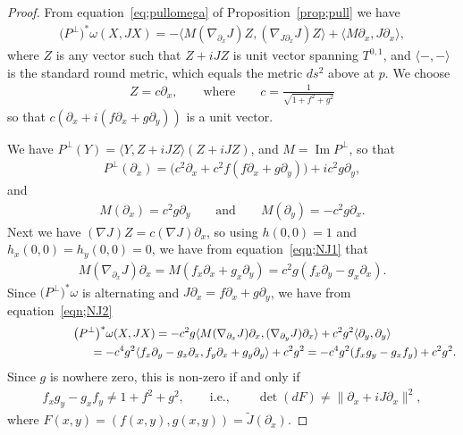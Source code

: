 \documentclass[pdftex]{sigma}
\numberwithin{equation}{section}
\begin{document}
\begin{proof}
From equation~\eqref{eq;pullomega} of Proposition~\ref{prop;pull} we have
\begin{gather*}
\big(P^\perp\big)^*\omega(X,JX) = - \langle M ( \nabla_{\partial_x} J ) Z, ( \nabla_{J \partial_x} J ) Z \rangle +
 \langle M \partial_x , J\partial_x \rangle,
\end{gather*}
where $Z$ is any vector such that $Z + iJZ$ is unit vector spanning $T^{0,1}$, and $ \langle - , - \rangle$ is the standard round metric, which equals the metric $ds^2$ above at $p$. We choose
\begin{gather*}
Z = c \partial_x, \qquad \textrm{where} \qquad c = \frac{1}{\sqrt{1+f^2+g^2}}
\end{gather*}
so that $c(\partial_x + i (f \partial_x + g \partial_y ) )$ is a unit vector.

We have $P^\perp(Y) = \langle Y, Z+iJZ \rangle (Z+iJZ)$, and $M= \operatorname{Im} P^\perp$, so that
\begin{gather*}
P^\perp(\partial_x) = \big( c^2 \partial_x + c^2 f ( f \partial_x + g \partial_y ) \big) + i c^2 g \partial_y ,
\end{gather*}
and
\begin{gather*}
M(\partial_x) = c^2 g \partial_y \qquad \textrm{and} \qquad M(\partial_y) = -c^2 g \partial_x.
\end{gather*}
Next we have $ (\nabla J) Z = c (\nabla J) \partial_x $, so using $h(0,0) =1$ and $h_x(0,0) = h_y(0,0) =0$, we have from equation~\eqref{eqn;NJ1} that
\begin{gather*}
M( \nabla_{\partial_x} J) \partial_x = M ( f_x \partial_x + g_x \partial_y ) = c^2 g ( f_x \partial_y - g_x \partial_x ).
\end{gather*}
Since $\big(P^\perp\big)^*\omega$ is alternating and $J \partial_x = f \partial_x + g \partial_y$, we have from equation~\eqref{eqn;NJ2}
\begin{gather*}
\big(P^\perp\big)^*\omega(X,JX) =-c^2 g \langle M ( \nabla_{\partial_x} J) \partial_x , ( \nabla_{\partial_y} J ) \partial_x \rangle +
 c^2 g^2 \langle \partial_y , \partial_y \rangle \\
\hphantom{\big(P^\perp\big)^*\omega(X,JX)}{} =-c^4 g^2 \langle f_x \partial_y - g_x \partial_x , f_y \partial_x + g_y \partial_y \rangle + c^2 g^2 = -c^4 g^2 (f_x g_y - g_x f_y )
 + c^2 g^2.
 \end{gather*}
Since $g$ is nowhere zero, this is non-zero if and only if
\begin{gather*}
f_x g_y - g_x f_y \neq 1+f^2+g^2, \qquad \text{i.e.}, \qquad
\det(dF) \neq \|\partial_x + i J \partial_x \|^2,
\end{gather*}
where $F(x,y) = (f(x,y),g(x,y)) = \tilde J (\partial_x)$.
\end{proof}
\end{document}
